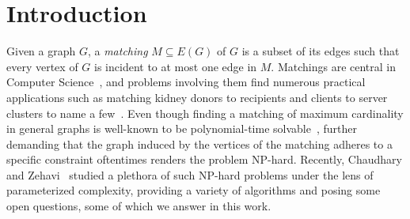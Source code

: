 \section{Introduction}\label{sec:introduction}

Given a graph $G$, a \emph{matching} $M \subseteq E(G)$ of $G$ is a subset of its edges such that
every vertex of $G$ is incident to at most one edge in $M$.
Matchings are central in Computer Science~\cite{books/LovaszP09},
and problems involving them find numerous practical applications such as matching kidney donors to recipients
and clients to server clusters to name a few~\cite{books/ws/Manlove13}.
Even though finding a matching of maximum cardinality in general graphs
is well-known to be polynomial-time solvable~\cite{focs/MicaliV80},
further demanding that the graph induced by the vertices of the matching adheres to a specific constraint
oftentimes renders the problem NP-hard.
Recently, Chaudhary and Zehavi~\cite{wg/ChaudharyZ23a} studied a plethora of such NP-hard problems
under the lens of parameterized complexity, providing a variety of algorithms and posing some open questions,
some of which we answer in this work.

